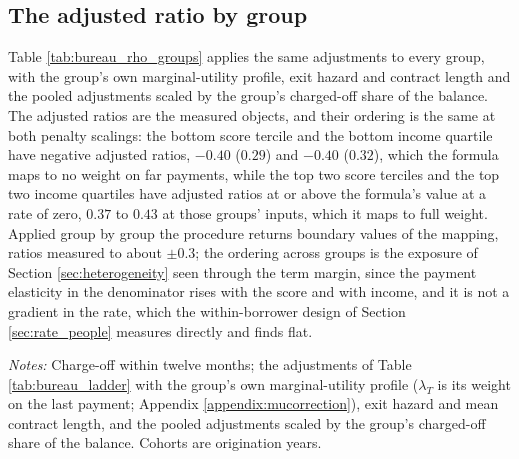 \subsection{The adjusted ratio by group}\label{appendix:strategies:groupladder}

Table \ref{tab:bureau_rho_groups} applies the same adjustments to every group, with the group's own marginal-utility profile, exit hazard and contract length and the pooled adjustments scaled by the group's charged-off share of the balance. The adjusted ratios are the measured objects, and their ordering is the same at both penalty scalings: the bottom score tercile and the bottom income quartile have negative adjusted ratios, $-0.40$ ($0.29$) and $-0.40$ ($0.32$), which the formula maps to no weight on far payments, while the top two score terciles and the top two income quartiles have adjusted ratios at or above the formula's value at a rate of zero, $0.37$ to $0.43$ at those groups' inputs, which it maps to full weight. Applied group by group the procedure returns boundary values of the mapping, ratios measured to about $\pm 0.3$; the ordering across groups is the exposure of Section \ref{sec:heterogeneity} seen through the term margin, since the payment elasticity in the denominator rises with the score and with income, and it is not a gradient in the rate, which the within-borrower design of Section \ref{sec:rate_people} measures directly and finds flat.

\begin{table}[H]
\centering
\caption{The adjusted across-borrower ratio by group}
\label{tab:bureau_rho_groups}
\small
\resizebox{\textwidth}{!}{}
\vspace{0.5em}
\begin{minipage}{0.92\textwidth}
\noindent \small \textit{Notes:} Charge-off within twelve months; the adjustments of Table \ref{tab:bureau_ladder} with the group's own marginal-utility profile ($\lambda_T$ is its weight on the last payment; Appendix \ref{appendix:mucorrection}), exit hazard and mean contract length, and the pooled adjustments scaled by the group's charged-off share of the balance. Cohorts are origination years.
\end{minipage}
\end{table}

